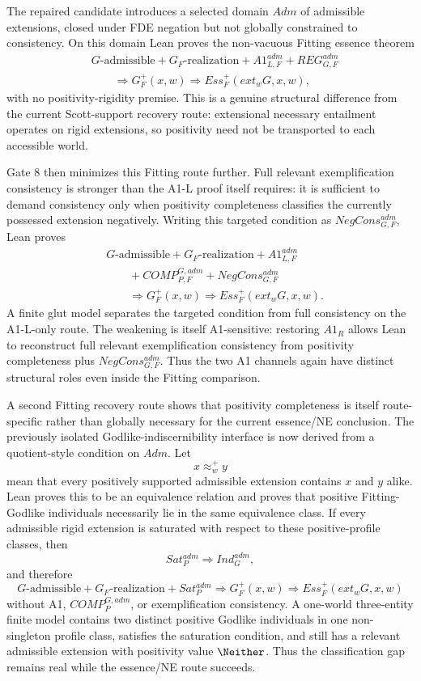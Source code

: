 The repaired candidate introduces a selected domain \(Adm\) of admissible extensions, closed under FDE negation but not globally constrained to consistency. On this domain Lean proves the non-vacuous Fitting essence theorem
\[
\begin{split}
  &G\text{-admissible}
  +G_F\text{-realization}
  +A1_{L,F}^{adm}
  +REG_{G,F}^{adm}\\
  &\qquad\Longrightarrow
  G_F^+(x,w)\Rightarrow Ess_F^+(ext_wG,x,w),
\end{split}
\]
with no positivity-rigidity premise. This is a genuine structural difference from the current Scott-support recovery route: extensional necessary entailment operates on rigid extensions, so positivity need not be transported to each accessible world.

Gate 8 then minimizes this Fitting route further. Full relevant exemplification consistency is stronger than the A1-L proof itself requires: it is sufficient to demand consistency only when positivity completeness classifies the currently possessed extension negatively. Writing this targeted condition as \(NegCons_{G,F}^{adm}\), Lean proves
\[
\begin{split}
  &G\text{-admissible}
  +G_F\text{-realization}
  +A1_{L,F}^{adm}\\
  &\qquad
  +COMP_{P,F}^{G,adm}
  +NegCons_{G,F}^{adm}\\
  &\qquad\Longrightarrow
  G_F^+(x,w)\Rightarrow Ess_F^+(ext_wG,x,w).
\end{split}
\]
A finite glut model separates the targeted condition from full consistency on the A1-L-only route. The weakening is itself A1-sensitive: restoring \(A1_R\) allows Lean to reconstruct full relevant exemplification consistency from positivity completeness plus \(NegCons_{G,F}^{adm}\). Thus the two A1 channels again have distinct structural roles even inside the Fitting comparison.

A second Fitting recovery route shows that positivity completeness is itself route-specific rather than globally necessary for the current essence/NE conclusion. The previously isolated Godlike-indiscernibility interface is now derived from a quotient-style condition on \(Adm\). Let
\[
  x\approx_w^+y
\]
mean that every positively supported admissible extension contains \(x\) and \(y\) alike. Lean proves this to be an equivalence relation and proves that positive Fitting-Godlike individuals necessarily lie in the same equivalence class. If every admissible rigid extension is saturated with respect to these positive-profile classes, then
\[
  Sat_P^{adm}\Longrightarrow Ind_G^{adm},
\]
and therefore
\[
  G\text{-admissible}
  +G_F\text{-realization}
  +Sat_P^{adm}
  \Longrightarrow
  G_F^+(x,w)\Rightarrow Ess_F^+(ext_wG,x,w)
\]
without A1, \(COMP_P^{G,adm}\), or exemplification consistency. A one-world three-entity finite model contains two distinct positive Godlike individuals in one non-singleton profile class, satisfies the saturation condition, and still has a relevant admissible extension with positivity value \(\Neither\). Thus the classification gap remains real while the essence/NE route succeeds.

